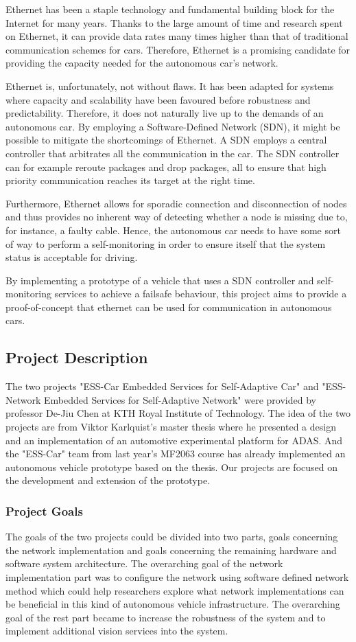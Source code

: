 \documentclass[11pt, titlepage]{article} %
\begin{document}
Ethernet has been a staple technology and fundamental building block for the Internet for
many years. Thanks to the large amount of time and research spent on Ethernet, it can
provide data rates many times higher than that of traditional communication schemes for
cars. Therefore, Ethernet is a promising candidate for providing the capacity needed for
the autonomous car's network.

Ethernet is, unfortunately, not without flaws. It has been adapted for systems where
capacity and scalability have been favoured before robustness and predictability. Therefore,
it does not naturally live up to the demands of an autonomous car. By employing a
Software-Defined Network (SDN), it might be possible to mitigate the shortcomings of Ethernet.
A SDN employs a central controller that arbitrates all the communication in the car. The
SDN controller can for example reroute packages and drop packages, all to ensure that
high priority communication reaches its target at the right time.

Furthermore, Ethernet allows for sporadic connection and disconnection of nodes and thus
provides no inherent way of detecting whether a node is missing due to, for instance, a
faulty cable. Hence, the autonomous car needs to have some sort of way to perform a
self-monitoring in order to ensure itself that the system status is acceptable
for driving.

By implementing a prototype of a vehicle that uses a SDN controller and self-monitoring
services to achieve a failsafe behaviour, this project aims to provide a proof-of-concept
that ethernet can be used for communication in autonomous cars.

\subsection{Project Description}
The two projects "ESS-Car Embedded Services for Self-Adaptive Car" and "ESS-Network Embedded Services for Self-Adaptive Network" were provided by professor De-Jiu Chen at KTH Royal Institute of Technology. The idea of the two projects are from Viktor Karlquist's master thesis \cite{Karlquist} where he presented a design and an implementation of an automotive experimental platform for ADAS. And the "ESS-Car" team from last year's MF2063 course has already implemented an autonomous vehicle prototype based on the thesis. Our projects are focused on the development and extension of the prototype.

\subsubsection{Project Goals}
The goals of the two projects could be divided into two parts, goals concerning the network implementation and goals concerning the remaining hardware and software system architecture.
The overarching goal of the network implementation part was to configure the network using software defined network method which could help researchers explore what network implementations can be beneficial in this kind of autonomous vehicle infrastructure. The overarching goal of the rest part became to increase the robustness of the system and to implement additional vision services into the system.
\end{document}
